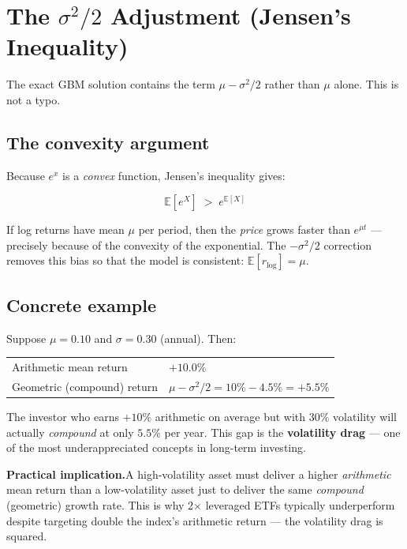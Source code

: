 \documentclass[11pt, a4paper]{article}
\newcommand{\E}{\mathbb{E}}
\begin{document}
\section{The $\sigma^2/2$ Adjustment (Jensen's Inequality)}
\label{sec:sigma2}

The exact GBM solution contains the term $\mu - \sigma^2/2$ rather than $\mu$ alone. This is not a typo.

\subsection*{The convexity argument}

Because $e^x$ is a \emph{convex} function, Jensen's inequality gives:

\[
  \E\!\left[e^X\right] \;>\; e^{\E[X]}
\]

If log returns have mean $\mu$ per period, then the \emph{price} grows faster than $e^{\mu t}$ — precisely because of the convexity of the exponential. The $-\sigma^2/2$ correction removes this bias so that the model is consistent: $\E[r_{\text{log}}] = \mu$.

\subsection*{Concrete example}

Suppose $\mu = 0.10$ and $\sigma = 0.30$ (annual). Then:

\begin{center}
\begin{tabular}{ll}
  Arithmetic mean return & $+10.0\%$ \\
  Geometric (compound) return & $\mu - \sigma^2/2 = 10\% - 4.5\% = +5.5\%$ \\
\end{tabular}
\end{center}

The investor who earns $+10\%$ arithmetic on average but with $30\%$ volatility will actually \emph{compound} at only $5.5\%$ per year. This gap is the \textbf{volatility drag} — one of the most underappreciated concepts in long-term investing.

\begin{tcolorbox}[warnbox]
\textbf{Practical implication.}\quad A high-volatility asset must deliver a higher \emph{arithmetic} mean return than a low-volatility asset just to deliver the same \emph{compound} (geometric) growth rate. This is why 2$\times$ leveraged ETFs typically underperform despite targeting double the index's arithmetic return — the volatility drag is squared.
\end{tcolorbox}
\end{document}

